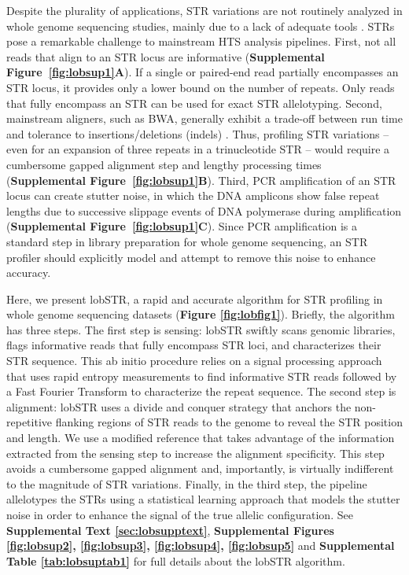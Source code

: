 Despite the plurality of applications, STR variations are not routinely analyzed in whole genome sequencing studies, mainly due to a lack of adequate tools \cite{TreangenSalzberg2012}. STRs pose a remarkable challenge to mainstream HTS analysis pipelines. First, not all reads that align to an STR locus are informative (\textbf{Supplemental Figure~\ref{fig:lobsup1}A}). If a single or paired-end read partially encompasses an STR locus, it provides only a lower bound on the number of repeats. Only reads that fully encompass an STR can be used for exact STR allelotyping. Second, mainstream aligners, such as BWA, generally exhibit a trade-off between run time and tolerance to insertions/deletions (indels) \cite{LiHomer2010}. Thus, profiling STR variations -- even for an expansion of three repeats in a trinucleotide STR -- would require a cumbersome gapped alignment step and lengthy processing times (\textbf{Supplemental Figure~\ref{fig:lobsup1}B}). Third, PCR amplification of an STR locus can create stutter noise, in which the DNA amplicons show false repeat lengths due to successive slippage events of DNA polymerase during amplification \cite{HaugeLitt1993,Ellegren2004} (\textbf{Supplemental Figure~\ref{fig:lobsup1}C}). Since PCR amplification is a standard step in library preparation for whole genome sequencing, an STR profiler should explicitly model and attempt to remove this noise to enhance accuracy.

Here, we present lobSTR, a rapid and accurate algorithm for STR profiling in whole genome sequencing datasets (\textbf{Figure \ref{fig:lobfig1}}). Briefly, the algorithm has three steps. The first step is sensing: lobSTR swiftly scans genomic libraries, flags informative reads that fully encompass STR loci, and characterizes their STR sequence. This ab initio procedure relies on a signal processing approach that uses rapid entropy measurements to find informative STR reads followed by a Fast Fourier Transform to characterize the repeat sequence. The second step is alignment: lobSTR uses a divide and conquer strategy that anchors the non-repetitive flanking regions of STR reads to the genome to reveal the STR position and length. We use a modified reference that takes advantage of the information extracted from the sensing step to increase the alignment specificity. This step avoids a cumbersome gapped alignment and, importantly, is virtually indifferent to the magnitude of STR variations. Finally, in the third step, the pipeline allelotypes the STRs using a statistical learning approach that models the stutter noise in order to enhance the signal of the true allelic configuration. See \textbf{Supplemental Text \ref{sec:lobsupptext}}, \textbf{Supplemental Figures \ref{fig:lobsup2}, \ref{fig:lobsup3}, \ref{fig:lobsup4}, \ref{fig:lobsup5}} and \textbf{Supplemental Table \ref{tab:lobsuptab1}} for full details about the lobSTR algorithm.

